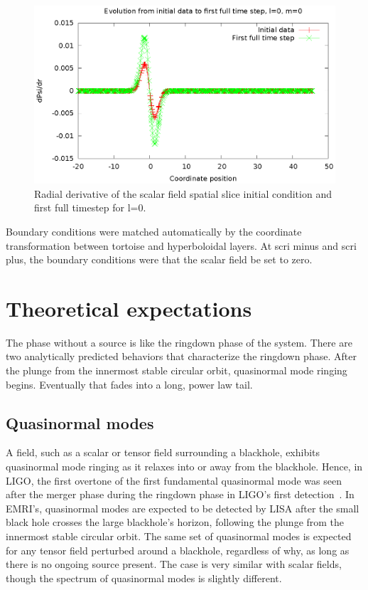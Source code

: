 \begin{figure}
  \includegraphics{phi1dl0}
  \caption{Radial derivative of the scalar field spatial slice initial condition and first full timestep for l=0.}
\end{figure}

Boundary conditions were matched automatically by the coordinate transformation between tortoise and hyperboloidal layers. At scri minus and scri plus, the boundary conditions were that the scalar field be set to zero. 

\section{Theoretical expectations}

The phase without a source is like the ringdown phase of the system. There are two analytically predicted behaviors that characterize the ringdown phase. After the plunge from the innermost stable circular orbit, quasinormal mode ringing begins. Eventually that fades into a long, power law tail.

\subsection{Quasinormal modes}
A field, such as a scalar or tensor field surrounding a blackhole, exhibits quasinormal mode ringing as it relaxes into or away from the blackhole.  Hence, in LIGO, the first overtone of the first fundamental quasinormal mode was seen after the merger phase during the ringdown phase in LIGO's first detection~\cite{LIGO1e}. In EMRI's, quasinormal modes are expected to be detected by LISA after the small black hole crosses the large blackhole's horizon, following the plunge from the innermost stable circular orbit. The same set of quasinormal modes is expected for any tensor field perturbed around a blackhole, regardless of why, as long as there is no ongoing source present. The case is very similar with scalar fields, though the spectrum of quasinormal modes is slightly different.

